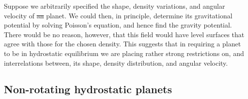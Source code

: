 \documentclass[a4paper,12pt]{paper}
\providecommand{\DIFadd}[1]{{\protect\color{blue}\uwave{#1}}} %
\providecommand{\DIFdel}[1]{{\protect\color{red}\sout{#1}}}                      %
\providecommand{\DIFaddbegin}{} %
\providecommand{\DIFaddend}{} %
\providecommand{\DIFdelbegin}{} %
\providecommand{\DIFdelend}{} %
\begin{document}
\DIFaddend Suppose we arbitrarily specified the shape, density variations, and angular velocity of \DIFdelbegin \DIFdel{an }\DIFdelend \DIFaddbegin \DIFadd{a }\DIFaddend planet. We could then, 
in principle, determine its gravitational potential by solving Poisson's equation, and hence find the gravity potential. 
There would be no reason, however, that this field would have level surfaces that agree with those for the chosen density. 
This suggests that in requiring a planet to be in hydrostatic equilibrium we are placing rather strong restrictions on,  and 
interrelations between, its  
shape, density distribution, and angular velocity.

\subsection*{Non-rotating hydrostatic planets}
\end{document}
